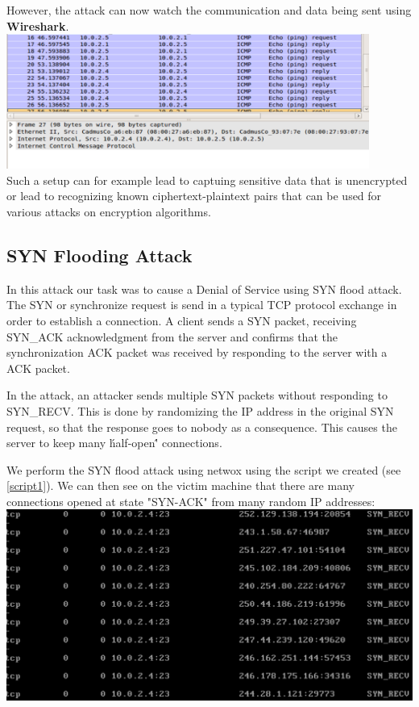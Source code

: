 \documentclass[12pt, a4paper, pdflatex]{article}
\begin{document}
However, the attack can now watch the communication and data being sent using \textbf{Wireshark}.\\

\includegraphics[width=450px]{gfx/imcp-shark}\\

Such a setup can for example lead to captuing sensitive data that is unencrypted or lead to recognizing known ciphertext-plaintext pairs that can be used for various attacks on encryption algorithms.




\subsection{SYN Flooding Attack}

In this attack our task was to cause a Denial of Service using SYN flood attack. The SYN or synchronize request is send in a typical TCP protocol exchange in order to establish a connection. A client sends a SYN packet, receiving SYN\_ACK acknowledgment from the server and confirms that the synchronization ACK packet was received by responding to the server with a ACK packet.

In the attack, an attacker sends multiple SYN packets without responding to SYN\_RECV. This is done by randomizing the IP address in the original SYN request, so that the response goes to nobody as a consequence. This causes the server to keep many \'half-open\'' connections.

We perform the SYN flood attack using netwox using the script we created (see \ref{script1}). We can then see on the victim machine that there are many connections opened at state "SYN-ACK" from many random IP addresses:\\
\includegraphics[width=.95\textwidth]{gfx/syn-netstat.png}
\end{document}
